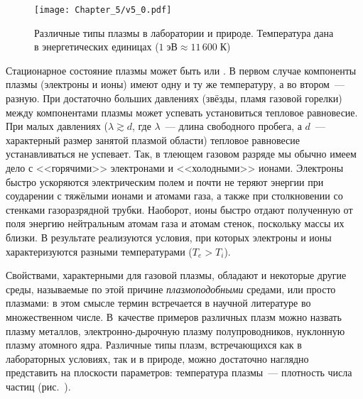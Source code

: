 \begin{figure}[ht]
    \centering
    \texttt{[image: Chapter\_5/v5\_0.pdf]}
    \caption{Различные типы плазмы в лаборатории и природе. Температура
    дана в энергетических единицах ($1\;эВ\approx 11\,600\;К$)}
\end{figure}

Стационарное состояние плазмы может быть
 или .
В первом случае компоненты плазмы (электроны и ионы) имеют одну и ту же температуру,
а во втором~--- разную. При достаточно больших
давлениях (звёзды, пламя газовой горелки) между компонентами плазмы может
успевать установиться тепловое равновесие. При
малых давлениях ($\lambda\gtrsim d$, где $\lambda$~--- длина свободного пробега, а
$d$~--- характерный размер занятой
плазмой области) тепловое равновесие устанавливаться не успевает.
Так, в тлеющем газовом разряде мы обычно имеем дело с
<<горячими>> электронами и <<холодными>> ионами.
Электроны быстро ускоряются электрическим полем и почти не теряют
энергии при соударении с тяжёлыми ионами и атомами газа, а также при
столкновении со стенками газоразрядной трубки. Наоборот, ионы быстро отдают
полученную от поля энергию нейтральным атомам газа и атомам стенок, поскольку
массы их близки. В результате реализуются условия, при которых электроны
и ионы характеризуются разными температурами ($T_e > T_i$).


Свойствами, характерными для газовой плазмы, обладают и некоторые другие среды,
называемые по этой причине
\emph{плазмоподобными} средами, или просто плазмами: в этом смысле термин
 встречается в научной литературе во множественном числе.
В~качестве примеров различных плазм можно назвать плазму металлов,
электронно-дырочную плазму полупроводников, нуклонную плазму атомного ядра.
Различные типы плазм, встречающихся как в лабораторных условиях,
так и в природе, можно достаточно наглядно представить на плоскости параметров:
температура плазмы~--- плотность числа частиц (рис.~).



